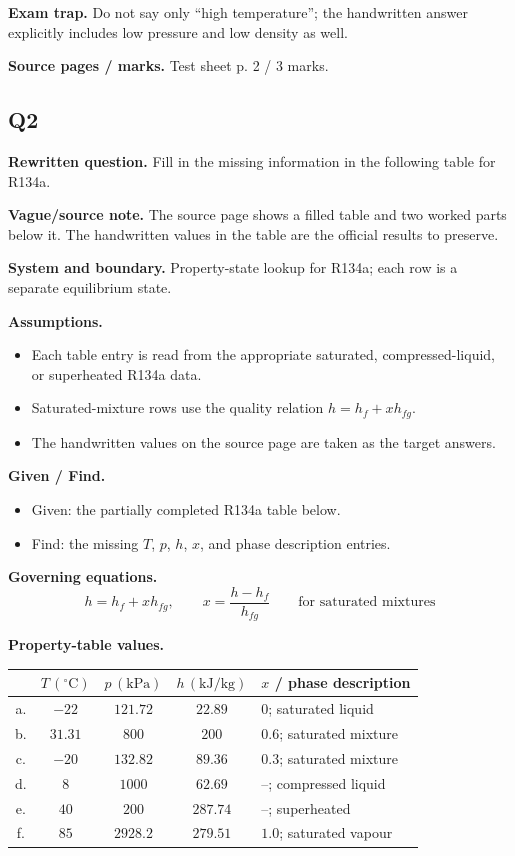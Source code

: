 \textbf{Exam trap.} Do not say only ``high temperature''; the handwritten answer explicitly includes low pressure and low density as well.

\textbf{Source pages / marks.} Test sheet p. 2 / 3 marks.

\subsection*{Q2}
\textbf{Rewritten question.} Fill in the missing information in the following table for R134a.

\textbf{Vague/source note.} The source page shows a filled table and two worked parts below it. The handwritten values in the table are the official results to preserve.

\textbf{System and boundary.} Property-state lookup for R134a; each row is a separate equilibrium state.

\textbf{Assumptions.}
\begin{itemize}
  \item Each table entry is read from the appropriate saturated, compressed-liquid, or superheated R134a data.
  \item Saturated-mixture rows use the quality relation $h=h_f+xh_{fg}$.
  \item The handwritten values on the source page are taken as the target answers.
\end{itemize}

\textbf{Given / Find.}
\begin{itemize}
  \item Given: the partially completed R134a table below.
  \item Find: the missing $T$, $p$, $h$, $x$, and phase description entries.
\end{itemize}

\textbf{Governing equations.}
\[
 h=h_f+xh_{fg}, \qquad x=\frac{h-h_f}{h_{fg}} \qquad \text{for saturated mixtures}
\]

\textbf{Property-table values.}
\begin{center}
\begin{tabular}{c c c c l}
\hline
& $T\,(^\circ\mathrm{C})$ & $p\,(\mathrm{kPa})$ & $h\,(\mathrm{kJ/kg})$ & $x$ / phase description \\
\hline
a. & $-22$ & $121.72$ & $22.89$ & $0$; saturated liquid \\
b. & $31.31$ & $800$ & $200$ & $0.6$; saturated mixture \\
c. & $-20$ & $132.82$ & $89.36$ & $0.3$; saturated mixture \\
d. & $8$ & $1000$ & $62.69$ & --; compressed liquid \\
e. & $40$ & $200$ & $287.74$ & --; superheated \\
f. & $85$ & $2928.2$ & $279.51$ & $1.0$; saturated vapour \\
\hline
\end{tabular}
\end{center}

